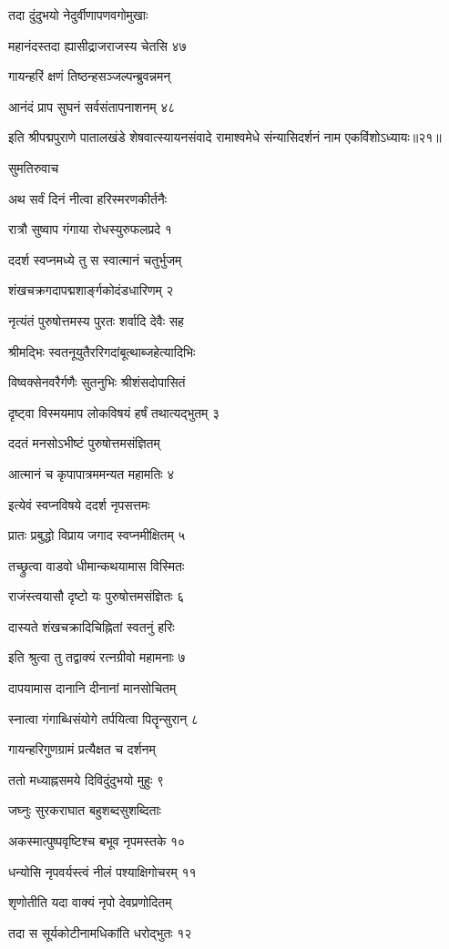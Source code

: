 तदा दुंदुभयो नेदुर्वीणापणवगोमुखाः

महानंदस्तदा ह्यासीद्राजराजस्य चेतसि ४७

गायन्हरिं क्षणं तिष्ठन्हसञ्जल्पन्ब्रुवन्नमन्

आनंदं प्राप सुघनं सर्वसंतापनाशनम् ४८

इति श्रीपद्मपुराणे पातालखंडे शेषवात्स्यायनसंवादे रामाश्वमेधे संन्यासिदर्शनं नाम एकविंशोऽध्यायः॥२१॥


सुमतिरुवाच

अथ सर्वं दिनं नीत्वा हरिस्मरणकीर्तनैः

रात्रौ सुष्वाप गंगाया रोधस्युरुफलप्रदे १

ददर्श स्वप्नमध्ये तु स स्वात्मानं चतुर्भुजम्

शंखचक्रगदापद्मशार्ङ्गकोदंडधारिणम् २

नृत्यंतं पुरुषोत्तमस्य पुरतः शर्वादि देवैः सह

श्रीमद्भिः स्वतनूयुतैररिगदांबूत्थाब्जहेत्यादिभिः

विष्वक्सेनवरैर्गणैः सुतनुभिः श्रीशंसदोपासितं

दृष्ट्वा विस्मयमाप लोकविषयं हर्षं तथात्यद्भुतम् ३

ददतं मनसोऽभीष्टं पुरुषोत्तमसंज्ञितम्

आत्मानं च कृपापात्रममन्यत महामतिः ४

इत्येवं स्वप्नविषये ददर्श नृपसत्तमः

प्रातः प्रबुद्धो विप्राय जगाद स्वप्नमीक्षितम् ५

तच्छ्रुत्वा वाडवो धीमान्कथयामास विस्मितः

राजंस्त्वयासौ दृष्टो यः पुरुषोत्तमसंज्ञितः ६

दास्यते शंखचक्रादिचिह्नितां स्वतनुं हरिः

इति श्रुत्वा तु तद्वाक्यं रत्नग्रीवो महामनाः ७

दापयामास दानानि दीनानां मानसोचितम्

स्नात्वा गंगाब्धिसंयोगे तर्पयित्वा पितॄन्सुरान् ८

गायन्हरिगुणग्रामं प्रत्यैक्षत च दर्शनम्

ततो मध्याह्नसमये दिविदुंदुभयो मुहुः ९

जघ्नुः सुरकराघात बहुशब्दसुशब्दिताः

अकस्मात्पुष्पवृष्टिश्च बभूव नृपमस्तके १०

धन्योसि नृपवर्यस्त्वं नीलं पश्याक्षिगोचरम् ११

शृणोतीति यदा वाक्यं नृपो देवप्रणोदितम्

तदा स सूर्यकोटीनामधिकांति धरोद्भुतः १२

